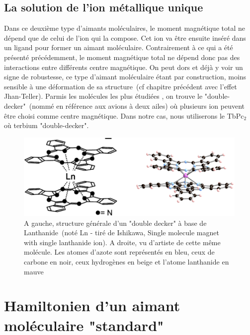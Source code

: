 \subsection{La solution de l'ion métallique unique}
Dans ce deuxième type d'aimants moléculaires, le moment magnétique total ne dépend que de celui de l'ion qui la compose. Cet ion va \^etre ensuite inséré dans un ligand pour former un aimant moléculaire. Contrairement à ce qui a été présenté précédemment, le moment magnétique total ne dépend donc pas des interactions entre différents centre magnétique. On peut dors et déjà y voir un signe de robustesse, ce type d'aimant moléculaire étant par construction, moins sensible à une déformation de sa structure~(cf chapitre précédent avec l'effet Jhan-Teller). Parmis les molécules les plus étudiées , on trouve le "double-decker"~(nommé en référence aux avions à deux ailes) où plusieurs ion peuvent \^etre choisi comme centre magnétique. Dans notre cas, nous utiliserons le TbPc$_2$ où terbium "double-decker".

\begin{figure}
\centering \includegraphics[scale=0.5]{Theorie/MagMol/figure2/figure2.png} 
\caption{A gauche, structure générale d'un "double decker" à base de Lanthanide~(noté Ln - tiré de Ishikawa, Single molecule magnet with single lanthanide ion). A droite, vu d'artiste de cette m\^eme molécule. Les atomes d'azote sont représentés en bleu, ceux de carbone en noir, ceux hydrogènes en beige et l'atome lanthanide en mauve}
\label{TbPc2}
\end{figure}

\section{Hamiltonien d'un aimant moléculaire "standard"}
